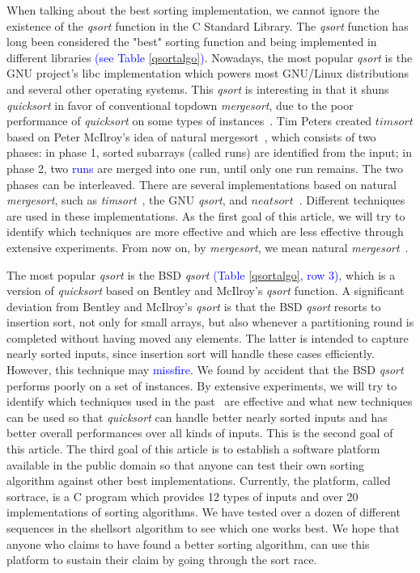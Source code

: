 \documentclass[AMA,STIX1COL]{WileyNJD-v2}
\newcommand{\qusort}{\emph{quicksort }}
\newcommand{\qsort}{\emph{qsort }}
\newcommand{\qsortn}{\emph{qsort}}
\newcommand{\tsortn}{\emph{timsort}}
\newcommand{\msortn}{\emph{mergesort}}
\begin{document}
When talking about the best sorting implementation, we cannot ignore the existence of the \qsort function in the C Standard Library.
The \qsort function has long been considered the "best" sorting function and being implemented in different libraries \textcolor{blue}{(see Table \ref{qsortalgo})}. 
Nowadays, the most popular \qsort is the GNU project’s libc implementation which powers most GNU/Linux distributions and several other operating systems. 
This \qsort is interesting in that it shuns \qusort in favor of conventional topdown \msortn, due to the poor performance of \qusort on some types of instances~\cite{gnumergesort}.  
Tim Peters created $timsort$ based on Peter McIlroy’s idea of natural mergesort~\cite{mcilroy1993optimistic}, which consists of two phases: in phase 1, sorted subarrays (called runs) are identified from the input; in phase 2, two \textcolor{blue}{runs} are merged into one run, until only one run remains. 
The two phases can be interleaved. 
There are several implementations based on natural \msortn, such as \tsortn~\cite{timsort}, the GNU \qsortn, and $neatsort$~\cite{la2014neatsort}. 
Different techniques are used in these implementations. 
As the first goal of this article, we will try to identify which techniques are more effective and which are less effective through extensive experiments. 
From now on, by \msortn, we mean natural \msortn~\cite{mcilroy1993optimistic}.

The most popular \qsort is the BSD \qsort \textcolor{blue}{(Table \ref{qsortalgo}, row 3)}, which is a version of \qusort based on Bentley and McIlroy’s \qsort function. 
A significant deviation from Bentley and McIlroy’s \qsort is that the BSD \qsort resorts to insertion sort, not only for small arrays, but also whenever a partitioning round is completed without having moved any elements. 
The latter is intended to capture nearly sorted inputs, since insertion sort will handle these cases efficiently. 
However, this technique may \textcolor{blue}{missfire}. We found by accident that the BSD \qsort performs poorly on a set of instances. 
By extensive experiments, we will try to identify which techniques used in the past~\cite{sedgewick1978implementing} are effective and what new techniques can be used so that \qusort can handle better nearly sorted inputs and has better overall performances over all kinds of inputs. 
This is the second goal of this article.
The third goal of this article is to establish a software platform available in the public domain so that anyone can test their own sorting algorithm against other best implementations. 
Currently, the platform, called sortrace, is a C program which provides 12 types of inputs and over 20 implementations of sorting algorithms. 
We have tested over a dozen of different sequences in the shellsort algorithm to see which one works best. 
We hope that anyone who claims to have found a better sorting algorithm, can use this platform to sustain their claim by going through the sort race.  
\end{document}
